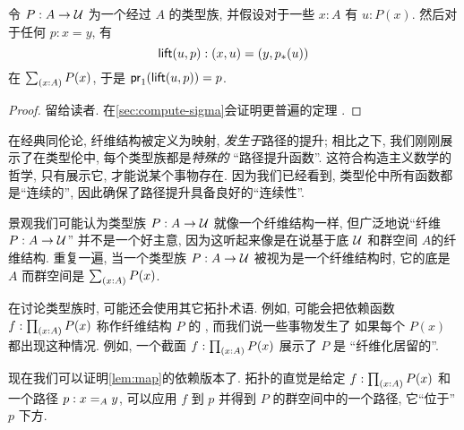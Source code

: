 \begin{lem}[路径提升性质]\label{thm:path-lifting}
%
%
令 $P:A\to\type$ 为一个经过 $A$ 的类型族, 并假设对于一些 $x:A$ 有 $u:P(x)$.
然后对于任何 $p:x=y$, 有
\begin{equation*}
\mathsf{lift}(u,p):(x,u)=(y,\trans{p}{u})
\end{equation*}
在 $\sm{x:A}P(x)$, 于是 $\ap{\proj1}{\mathsf{lift}(u,p)} = p$.
\end{lem}
\begin{proof}
留给读者.
在\cref{sec:compute-sigma}会证明更普遍的定理 .
\end{proof}

在经典同伦论, 纤维结构被定义为映射, \emph{发生于}路径的提升; 相比之下, 我们刚刚展示了在类型伦中, 每个类型族都是\emph{特殊的} ``路径提升函数''. 这符合构造主义数学的哲学, 只有展示它, 才能说某个事物存在. %
因为我们已经看到, 类型伦中所有函数都是``连续的'', 因此确保了路径提升具备良好的``连续性''.

\begin{rmk}
景观我们可能认为类型族 $P:A\to \type$ 就像一个纤维结构一样, 但广泛地说``纤维 $P:A\to\type$'' 并不是一个好主意, 因为这听起来像是在说基于底 $\type$ 和群空间 $A$的纤维结构.
重复一遍, 当一个类型族 $P:A\to \type$ 被视为是一个纤维结构时, 它的底是 $A$ 而群空间是 $\sm{x:A} P(x)$.

在讨论类型族时, 可能还会使用其它拓扑术语.
例如, 可能会把依赖函数 $f:\prd{x:A} P(x)$ 称作纤维结构 $P$ 的
%
, 而我们说一些事物发生了
%
如果每个 $P(x)$ 都出现这种情况.
例如, 一个截面 $f:\prd{x:A} P(x)$ 展示了 $P$ 是 ``纤维化居留的''.
\end{rmk}

现在我们可以证明\cref{lem:map}的依赖版本了. 拓扑的直觉是给定 $f:\prd{x:A} P(x)$ 和一个路径 $p:\id[A]xy$, 可以应用 $f$ 到 $p$ 并得到 $P$  的群空间中的一个路径, 它``位于'' $p$ 下方.

\begin{center}
\end{center}

